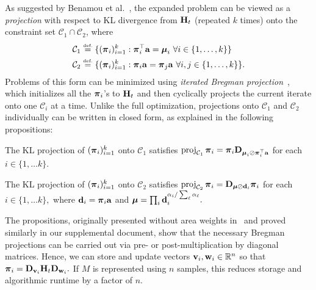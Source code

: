 As suggested by Benamou et al.~, the expanded problem can be viewed as a \emph{projection} with respect to KL divergence from $\mathbf{H}_t$ (repeated $k$ times) onto the constraint set $\mathcal C_1\cap\mathcal C_2$, where
\begin{align*}
\mathcal C_1 & \eqdef \{(\bpi_i)_{i=1}^k : \bpi_i^\top \a = \p_i\ \forall i\in\{1,\ldots,k\}\}\\
\mathcal C_2 & \eqdef \{(\bpi_i)_{i=1}^k :\bpi_i \a=\bpi_j\a \ \forall i,j\in\{1,\ldots,k\}\}.
\end{align*}
Problems of this form can be minimized using \emph{iterated Bregman projection}~\cite{Bregman-1967}, which initializes all the $\boldsymbol{\pi}_i$'s to $\mathbf{H}_t$ and then cyclically projects the current iterate onto one $\mathcal C_i$ at a time.  Unlike the full optimization, projections onto $\mathcal C_1$ and $\mathcal C_2$ individually can be written in closed form, as explained in the following propositions:

\begin{proposition}\label{prop:interp_formulas}
The KL projection of $(\boldsymbol{\pi}_i)_{i=1}^k$ 
onto $\mathcal C_1$ satisfies $\mathrm{proj}_{\mathcal C_1}\,\boldsymbol{\pi}_i=\boldsymbol{\pi}_i \mathbf{D}_{\boldsymbol{\mu}_i\oslash\boldsymbol{\pi}_i^\top\mathbf a}$ for each $i\in\{1,\ldots k\}.$
\end{proposition}


\begin{proposition}\label{prop:interp_formulas2}
The KL projection of $(\boldsymbol{\pi}_i)_{i=1}^k$ %
onto $\mathcal C_2$ satisfies $\mathrm{proj}_{\mathcal C_2}\,\boldsymbol{\pi}_i=\mathbf{D}_{\boldsymbol{\mu}\oslash\mathbf d_i}\boldsymbol{\pi}_i$ for each $i\in\{1,\ldots k\},$ where $\mathbf d_i=\boldsymbol{\pi}_i\mathbf a$ and $\boldsymbol{\mu}=\prod_i \mathbf d_{i}^{\alpha_i/\sum_{\ell} \alpha_{\ell}}.$
\end{proposition}

The propositions, originally presented without area weights in~\cite{Benamou-IterBregman-2014} and proved similarly in our supplemental document, show that the necessary Bregman projections can be carried out via pre- or post-multiplication by diagonal matrices.  Hence, we can store and update vectors $\mathbf v_i,\mathbf w_i\in\mathbb{R}^n$ so that $\boldsymbol{\pi}_i=\mathbf{D}_{\mathbf v_i} \mathbf{H}_t \mathbf{D}_{\mathbf w_i}.$  If $M$ is represented using $n$ samples, this reduces storage and algorithmic runtime by a factor of $n$.

